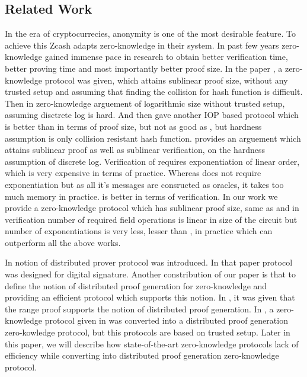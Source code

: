 \subsection{Related Work}

In the era of cryptocurrecies, anonymity is one of the most desirable feature. To achieve this Zcash adapts zero-knowledge in their system. In past few years zero-knowledge gained immense pace in research to obtain better verification time, better proving time and most importantly better proof size. In the paper \cite{Ligero2017}, a zero-knowledge protocol was given, which attains sublinear proof size, without any trusted setup and assuming that finding the collision for hash function is difficult. Then in \cite{Bulletproofs} zero-knowledge arguement of logarithmic size without trusted setup, assuming disctrete log is hard. And then \cite{Aurora} gave another IOP based protocol which is better than \cite{Ligero2017} in terms of proof size, but not as good as \cite{Bulletproofs}, but hardness assumption is only collision resistant hash function. \cite{spartan} provides an arguement which attains sublinear proof as well as sublinear verification, on the hardness assumption of discrete log. Verification of \cite{Bulletproofs} requires exponentiation of linear order, which is very expensive in terms of practice. Whereas \cite{Aurora} does not require exponentiation but as all it's messages are consructed as oracles, it takes too much memory in practice. \cite{spartan} is better in terms of verification. In our work we provide a zero-knowledge protocol which has sublinear proof size, same as \cite{spartan} and in verification number of required field operations is linear in size of the circuit but number of exponentiations is very less, lesser than \cite{spartan}, in practice which can outperform all the above works.

In \cite{DDS} notion of distributed prover protocol was introduced. In that paper protocol was designed for digital signature. Another constribution of our paper is that to define the notion of distributed proof generation for zero-knowledge and providing an efficient protocol which supports this notion. In \cite{Bulletproofs}, it was given that the range proof supports the notion of distributed proof generation. In \cite{Trinocchio}, a zero-knowledge protocol given in \cite{pinnochio_PHGR} was converted into a distributed proof generation zero-kowledge protocol, but this protocols are based on trusted setup. Later in this paper, we will describe how state-of-the-art zero-knowledge protocols lack of efficiency while converting into distributed proof generation zero-knowledge protocol.  